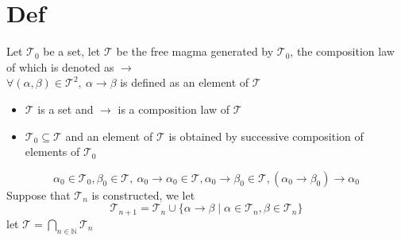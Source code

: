 \documentclass{book}
\begin{document}
\section{Def}
Let $\mathcal{T}_0$ be a set, let $\mathcal{T}$ be the free magma generated by $\mathcal{T}_0$, the composition law of which is denoted as $\rightarrow$\\
$\forall(\alpha,\beta)\in \mathcal{T}^2,\ \alpha\rightarrow\beta$ is defined as an element of $\mathcal{T}$
\begin{itemize}
    \item $\mathcal{T}$ is a set and $\rightarrow$ is a composition law of $\mathcal{T}$
    \item $\mathcal{T}_0\subseteq\mathcal{T}$ and an element of $\mathcal{T}$ is obtained by successive composition of elements of $\mathcal{T}_0$
\end{itemize}
$$\alpha_0\in \mathcal{T}_0,\beta_0\in \mathcal{T},\ \alpha_0\rightarrow\alpha_0\in \mathcal{T},\alpha_0\rightarrow\beta_0\in \mathcal{T},(\alpha_0\rightarrow\beta_0)\rightarrow\alpha_0$$
Suppose that $\mathcal{T}_n$ is constructed, we let $$\mathcal{T}_{n+1}=\mathcal{T}_n\cup\{\alpha\rightarrow\beta\mid\alpha\in \mathcal{T}_n,\beta\in \mathcal{T}_n\}$$
let $\mathcal{T}=\bigcap\limits_{n\in \mathbb{N}}\mathcal{T}_n$
\end{document}

